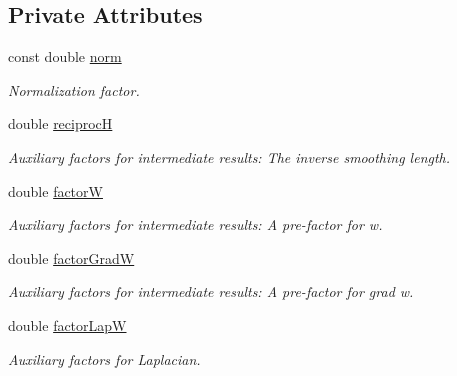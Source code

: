 \subsection*{Private Attributes}
\begin{CompactItemize}
\item 
\hypertarget{classQuinticSpline_bd65ef2de82ce850ec80393582726532}{
const double \hyperlink{classQuinticSpline_bd65ef2de82ce850ec80393582726532}{norm}}
\label{classQuinticSpline_bd65ef2de82ce850ec80393582726532}

\begin{CompactList}\small\item\em Normalization factor. \item\end{CompactList}\item 
\hypertarget{classQuinticSpline_743bd6fe1beb6049f5bdcf76beba04e2}{
double \hyperlink{classQuinticSpline_743bd6fe1beb6049f5bdcf76beba04e2}{reciprocH}}
\label{classQuinticSpline_743bd6fe1beb6049f5bdcf76beba04e2}

\begin{CompactList}\small\item\em Auxiliary factors for intermediate results: The inverse smoothing length. \item\end{CompactList}\item 
\hypertarget{classQuinticSpline_e260195cb042866d86a822f469a1277f}{
double \hyperlink{classQuinticSpline_e260195cb042866d86a822f469a1277f}{factorW}}
\label{classQuinticSpline_e260195cb042866d86a822f469a1277f}

\begin{CompactList}\small\item\em Auxiliary factors for intermediate results: A pre-factor for w. \item\end{CompactList}\item 
\hypertarget{classQuinticSpline_fda98a6d7b9feda4e30871111ece88b3}{
double \hyperlink{classQuinticSpline_fda98a6d7b9feda4e30871111ece88b3}{factorGradW}}
\label{classQuinticSpline_fda98a6d7b9feda4e30871111ece88b3}

\begin{CompactList}\small\item\em Auxiliary factors for intermediate results: A pre-factor for grad w. \item\end{CompactList}\item 
\hypertarget{classQuinticSpline_5cf5d05e9069c965ffc315770a1206ec}{
double \hyperlink{classQuinticSpline_5cf5d05e9069c965ffc315770a1206ec}{factorLapW}}
\label{classQuinticSpline_5cf5d05e9069c965ffc315770a1206ec}

\begin{CompactList}\small\item\em Auxiliary factors for Laplacian. \item\end{CompactList}\end{CompactItemize}


